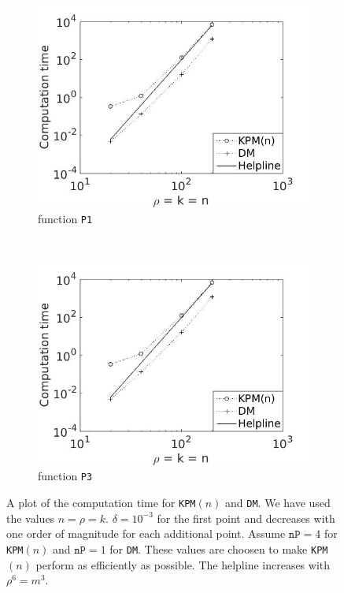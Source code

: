 \begin{figure}[H]
        \centering
        \begin{subfigure}[b]{0.45\textwidth}
                \includegraphics[width=\textwidth]{fig/comp2}
                \caption{function \texttt{P1}}
                \label{fig:c1comp1m}
        \end{subfigure}%
        ~
        \begin{subfigure}[b]{0.45\textwidth}
                \includegraphics[width=\textwidth]{fig/comp2}
                \caption{function \texttt{P3}}
                \label{fig:c2comp2m}
        \end{subfigure}
        \caption{A plot of the computation time for \texttt{KPM}$(n)$ and \texttt{DM}. We have used the values $n = \rho = k$. $\delta = 10^{-3}$ for the first point and decreases with one order of magnitude for each additional point. Assume $\texttt{nP} = 4$ for \texttt{KPM}$(n)$ and $\texttt{nP} = 1$ for \texttt{DM}. These values are choosen to make \texttt{KPM}$(n)$ perform as efficiently as possible. The helpline increases with $\rho^6 = m^3$.}\label{fig:comp}
\end{figure}
